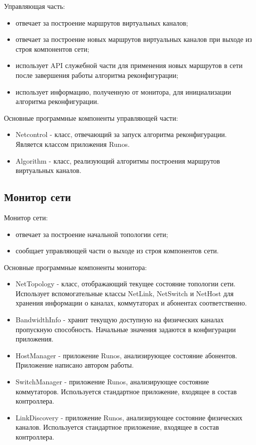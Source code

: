 \documentclass[12pt]{article}
\begin{document}
	Управляющая часть:
	\begin{itemize}
		\item отвечает за построение маршрутов виртуальных каналов;
		\item отвечает за построение новых маршрутов виртуальных каналов при выходе из строя компонентов сети;
		\item использует API служебной части для применения новых маршрутов в сети после завершения работы алгоритма реконфигурации;
		\item использует информацию, полученную от монитора, для инициализации алгоритма реконфигурации.
	\end{itemize}
	
	\noindent
	Основные программные компоненты управляющей части:
	\begin{itemize}
		\item Netcontrol - класс, отвечающий за запуск алгоритма реконфигурации. Является классом приложения Runos.
		\item Algorithm - класс, реализующий алгоритмы построения маршрутов виртуальных каналов.
	\end{itemize}


	\subsection{Монитор сети}
	
	Монитор сети:
	\begin{itemize}
		\item отвечает за построение начальной топологии сети;
		\item сообщает управляющей части о выходе из строя компонентов сети.
	\end{itemize}
	
	\noindent
	Основные программные компоненты монитора:
	\begin{itemize}
		\item NetTopology - класс, отображающий текущее состояние топологии сети. Использует вспомогательные классы NetLink, NetSwitch и NetHost для хранения информации о каналах, коммутаторах и абонентах соответственно.
		\item BandwidthInfo - хранит текущую доступную на физических каналах пропускную способность. Начальные значения задаются в конфигурации приложения.
		\item HostManager - приложение Runos, анализирующее состояние абонентов. Приложение написано автором работы.
		\item SwitchManager - приложение Runos, анализирующее состояние коммутаторов. Используется стандартное приложение, входящее в состав контроллера.
		\item LinkDiscovery - приложение Runos, анализирующее состояние физических каналов. Используется стандартное приложение, входящее в состав контроллера.
	\end{itemize}
\end{document}
